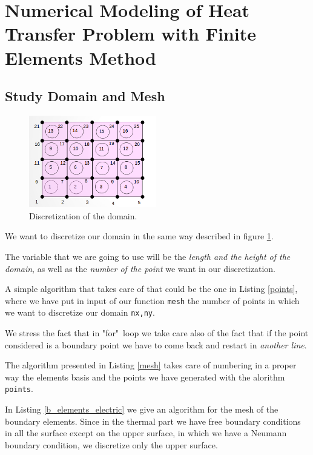 \section{Numerical Modeling of Heat Transfer Problem with Finite Elements Method}
\subsection{Study Domain and Mesh}
\label{sec:4.1}
\begin{figure}
	\centering
	\includegraphics[height=4cm]{Images/mesh.png}
	\caption{Discretization of the domain.}
	\label{figure:mesh}
\end{figure}
\begin{mdframed}
	We want to discretize our domain in the same way described in figure \ref{figure:mesh}.
	
	The variable that we are going to use will be the \emph{length and the height of the domain}, as well as the \emph{number of the point} we want in our discretization. 
	
	A simple algorithm that takes care of that could be the one in Listing \ref{points}, where we have put in input of our function \texttt{mesh} the number of points in which we want to discretize our domain \texttt{nx,ny}.   
	
	
	
	We stress the fact that in "for"~loop we take care also of the fact that if the point considered is a boundary point we have to come back and restart in \emph{another line}.
	
	The algorithm presented in Listing \ref{mesh} takes care of numbering in a proper way the elements basis and the points we have generated with the alorithm \texttt{points}.
	
	
	In Listing \ref{b_elements_electric} we give an algorithm for the mesh of the boundary elements. Since in the thermal part we have free boundary conditions in all the surface except on the upper surface, in which we have a Neumann boundary condition, we discretize only the upper surface. 
	  
	
\end{mdframed}
